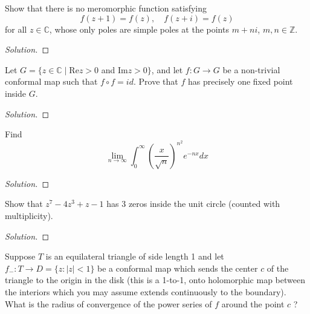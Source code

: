 \documentclass[10pt]{article}
\newenvironment{soln}{\begin{proof}[Solution]}{\end{proof}}
\begin{document}
\begin{problem}
[2006 J-II-2]
Show that there is no meromorphic function satisfying
$$
f(z+1)=f(z), \quad f(z+i)=f(z)
$$
for all $z \in \mathbb{C}$, whose only poles are simple poles at the points $m+n i$, $m, n \in \mathbb{Z}$.
\end{problem}

\begin{soln}

\end{soln}



\begin{problem}
[2006 A-I-4]
Let $G=\{z \in \mathbb{C} \mid \text{Re} z>0$ and $\text{Im} z>0\}$, and let $f: G \rightarrow G$ be a non-trivial conformal map such that $f \circ f=i d$. Prove that $f$ has precisely one fixed point inside $G$.
\end{problem}

\begin{soln}

\end{soln}



\begin{problem}
[2006 A-II-1]
Find
$$
\lim _{n \rightarrow \infty} \int_0^{\infty}\left(\frac{x}{\sqrt{n}}\right)^{n^2} e^{-n x} d x
$$
\end{problem}

\begin{soln}

\end{soln}



\begin{problem}
[2006 A-II-4]
Show that $z^7-4 z^3+z-1$ has 3 zeros inside the unit circle (counted with multiplicity).
\end{problem}

\begin{soln}

\end{soln}



\begin{problem}
[2005 J-I-2]
Suppose $T$ is an equilateral triangle of side length 1 and let $f_{-}: T \rightarrow D=\{z:|z|<1\}$ be a conformal map which sends the center $c$ of the triangle to the origin in the disk (this is a 1-to-1, onto holomorphic map between the interiors which you may assume extends continuously to the boundary). What is the radius of convergence of the power series of $f$ around the point $c$ ?
\end{problem}
\end{document}
